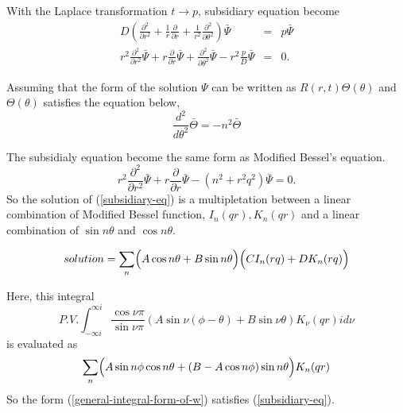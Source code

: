 \documentclass{article}
\begin{document}
With the Laplace transformation $t\rightarrow p$, subsidiary equation become
\begin{eqnarray}
    D\left( \frac{\partial^2}{\partial r^2} +
            \frac{1}{r}\frac{\partial}{\partial r} +
            \frac{1}{r^2}\frac{\partial^2}{\partial \theta^2}
            \right)
    \bar{\Psi}
    &=&
    p\bar{\Psi} \nonumber \\
    r^2 \frac{\partial^2}{\partial r^2}\bar{\Psi} +
    r   \frac{\partial}{\partial r}\bar{\Psi} +
        \frac{\partial^2}{\partial \theta^2}\bar{\Psi} -
    r^2 \frac{p}{D}\bar{\Psi} &=& 0.
\end{eqnarray}

Assuming that the form of the solution $\Psi$ can be written as
 $R(r, t)\Theta(\theta)$ and $\Theta(\theta)$ satisfies the equation below, 
\begin{equation}
    \frac{d^2}{d\theta^2}\bar{\Theta} = -n^2\bar{\Theta}
\end{equation}

The subsidialy equation become the same form as Modified Bessel's equation.
\begin{equation} \label{subsidiary-eq}
    r^2\frac{\partial^2}{\partial r^2}\bar{\Psi} +
    r\frac{\partial}{\partial r}\bar{\Psi} -(n^2 + r^2q^2)\bar{\Psi} = 0.
\end{equation}
So the solution of (\ref{subsidiary-eq}) is a multipletation between
 a linear combination of Modified Bessel function, $I_n(qr), K_n(qr)$ and
 a linear combination of $\sin n\theta$ and $\cos n\theta$.

\begin{equation}\label{solution-of-subsidialy-equation}
    solution = \sum_n\Bigl( A\cos n\theta + B\sin n\theta\Bigr)
    \Bigl(CI_n(rq) + DK_n(rq)\Bigr)
\end{equation}

Here, this integral
\begin{equation}\label{general-integral-form-of-w}
P.V.\int^{\infty i}_{-\infty i}
    \frac{\cos\nu\pi}{\sin\nu\pi}
    (A\sin\nu(\phi - \theta) + B\sin\nu\theta)
    K_\nu(qr)id\nu
\end{equation}
is evaluated as
\begin{equation}
    \sum_n\Bigl( A\sin n\phi\cos n\theta + (B-A\cos n\phi)\sin n\theta\Bigr)K_n(qr)
\end{equation}
So the form (\ref{general-integral-form-of-w}) satisfies (\ref{subsidiary-eq}).
\end{document}
